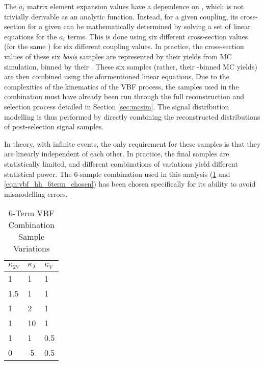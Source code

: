     The $a_i$ matrix element expansion values have a dependence on \mhh, which is not trivially derivable as an analytic function.
    Instead, for a given coupling, its cross-section for a given \mhh can be mathematically determined by solving a set of linear equations for the $a_i$ terms.
    This is done using six different cross-section values (for the same \mhh) for six different coupling values.
    In practice, the cross-section values of these six \textit{basis} samples are represented by their yields from MC simulation, binned by their \mhh.
    These six samples (rather, their \mhh-binned MC yields) are then combined using the aformentioned linear equations.
    Due to the complexities of the kinematics of the VBF process,
        the samples used in the combination must have already been run through the full reconstruction and selection process detailed in Section \ref{sec:mcsim}.
    The signal distribution modelling is thus performed by directly combining the reconstructed \mhh distributions of post-selection signal samples.

    In theory, with infinite events, the only requirement for these samples is that they are linearly independent of each other.
    In practice, the final samples are statistically limited, and different combinations of variations yield different statistical power.
    The 6-sample combination used in this analysis (\ref{tab:vbf_hh_6term_varlist} and \ref{eqn:vbf_hh_6term_chosen}) has been chosen specifically for its ability to avoid mismodelling errors.

    \begin{table}[] \centering
    \caption{6-Term VBF Combination Sample Variations}
    \label{tab:vbf_hh_6term_varlist}
    \begin{tabular}{ |l|l|l| }
        \hline
        \textbf {$\kappa_{2V}$} & \textbf {$\kappa_\lambda$} & \textbf {$\kappa_V$} \\
        \hline
            1   &   1 & 1   \\
            1.5 &   1 & 1   \\
            1   &   2 & 1   \\
            1   &  10 & 1   \\
            1   &   1 & 0.5 \\
            0   &  -5 & 0.5 \\
        \hline
    \end{tabular} \end{table}

